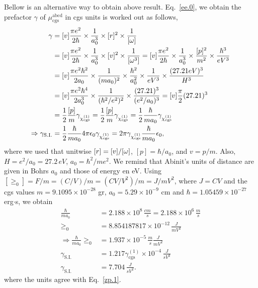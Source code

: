 \documentclass[12pt]{article}
\numberwithin{equation}{section}
\begin{document}
\begin{enumerate}
Bellow is an alternative way to obtain above result.
Eq.~\eqref{ee.0}, we obtain the prefactor $\gamma$ of  
$\mu^{\mathrm{abcd}}_{\mathrm{cgs}}$ in  
 cgs  units is worked out as follows, 
\begin{align}\label{e.4c}
\gamma&=[v]
\frac{\pi e^2}{2\hbar}\times\frac{1}{a^3_0}\times[r]^2\times\frac{1}{[\omega]}
\nonumber\\
&=[v]
\frac{\pi e^2}{2\hbar}\times\frac{1}{a^3_0}\times[v]^2\times\frac{1}{[\omega^3]}
=[v]
\frac{\pi e^2}{2\hbar}\times\frac{1}{a^3_0}\times\frac{[p]^2}{m^2}
\times\frac{\hbar^3}{eV^3}
\nonumber\\
&=[v]
\frac{\pi e^2\hbar^2}{2a_0}\times\frac{1}{(ma_0)^2}\times\frac{\hbar^2}{a^2_0}
\times\frac{1}{eV^3}\times \frac{(27.21eV)^3}{H^3}
\nonumber\\
&=[v]
\frac{\pi e^2\hbar^4}{2a^3_0}\times\frac{1}{(\hbar^2/e^2)^2}
\times \frac{(27.21)^3}{(e^2/a_0)^3}
=[v]
\frac{\pi}{2}(27.21)^3 
\nonumber\\
&=
\frac{1}{2}\frac{[p]}{m}\gamma_{\chi^{(1)}_{\mathrm{cgs}}} 
=\frac{1}{2}\frac{[p]}{m}\gamma_{\chi^{(1)}_{\mathrm{cgs}}} 
=\frac{1}{2}
\frac{\hbar}{ma_0}
\gamma_{\chi^{(1)}_{\mathrm{cgs}}} 
\nonumber\\
\Rightarrow 
\gamma_{\mathrm{S.I.}} &=
\frac{1}{2}\frac{\hbar}{ma_0}
 4\pi\epsilon_0\gamma_{\chi^{(1)}_{\mathrm{cgs}}} 
=2\pi\gamma_{\chi^{(1)}_{\mathrm{cgs}}}  \frac{\hbar}{ma_0}
\epsilon_0 
,
\end{align}  
where we used that unitwise $[r]=[v]/[\omega]$, $[p]=\hbar/a_0$, and $v=p/m$.
Also, $H=e^2/a_0=27.2\,eV$, $a_0=\hbar^2/me^2$. We remind that Abinit\Reg's 
units of distance are given in Bohrs $a_0$ and those of energy en eV.
Using 
$[\ge_0]=F/m=(C/V)/m=(CV/V^2)/m=J/mV^2$, where $J=CV$
and the 
cgs values $m=9.1095\times 10^{-28}$ gr,
$a_0=5.29\times 10^{-9}$ cm  
and $\hbar=1.05459\times 10^{-27}$ erg$\cdot$s, we obtain  
\begin{align}\label{e.5}
\frac{\hbar}{ma_0}
&=2.188\times 10^{8}\,\frac{cm}{s}
=2.188\times 10^{6}\,\frac{m}{s}
\nonumber\\
\ge_0&=8.854187817\times 10^{-12}\,\frac{J}{mV^2}
\nonumber\\
\Rightarrow  
\frac{\hbar}{ma_0}
\ge_0&=1.937\times 10^{-5}\,\frac{m}{s}\frac{J}{mV^2}
\nonumber\\
\gamma_{\mathrm{S.I.}} &= 
1.217 
\gamma^{(1)}_{\mathrm{cgs}}\times 10^{-4} \,\frac{J}{sV^2}
\nonumber\\
\gamma_{\mathrm{S.I.}} &= 
7.704\,\frac{J}{sV^2}
.  
\end{align} 
where the units agree with Eq.~\eqref{zp.1}. 


\end{enumerate}
\end{document}

